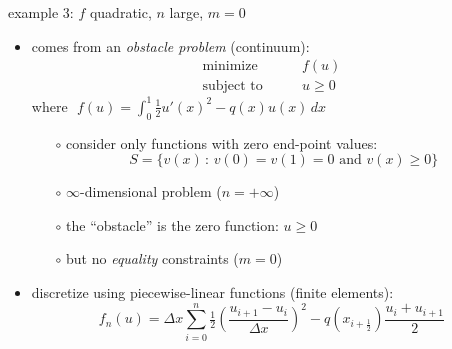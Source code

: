 \documentclass[10pt,hyperref,dvipsnames]{beamer}
\newcommand{\ds}{\displaystyle}
\begin{document}
\begin{frame}{example 3: $f$ quadratic, $n$ large, $m=0$}

\begin{itemize}
\item comes from an \emph{obstacle problem} (continuum):
\begin{equation*}
\begin{matrix}
\text{minimize} \qquad & f(u) \\
\text{subject to} \qquad & u \ge 0
\end{matrix}
\end{equation*}
where \,\,$\ds f(u) = \int_0^1 \tfrac{1}{2} u'(x)^2 - q(x) u(x)\,dx$

    \begin{itemize}
    \item[$\circ$] consider only functions with zero end-point values:
    	$$S = \{v(x)\,:\, v(0)=v(1)=0 \text{ and } v(x) \ge 0\}$$
    \item[$\circ$] $\infty$-dimensional problem ($n=+\infty$)
    \item[$\circ$] the ``obstacle'' is the zero function: $u\ge 0$
    \item[$\circ$] but no \emph{equality} constraints ($m=0$)
    \end{itemize}
\item discretize using piecewise-linear functions (finite elements):
\begin{equation*}
    f_n(u) = \Delta x \sum_{i=0}^n \tfrac{1}{2}\left(\frac{u_{i+1}-u_i}{\Delta x}\right)^2 - q(x_{i+\frac{1}{2}}) \frac{u_i + u_{i+1}}{2}
\end{equation*}
\end{itemize}
\end{frame}
\end{document}
